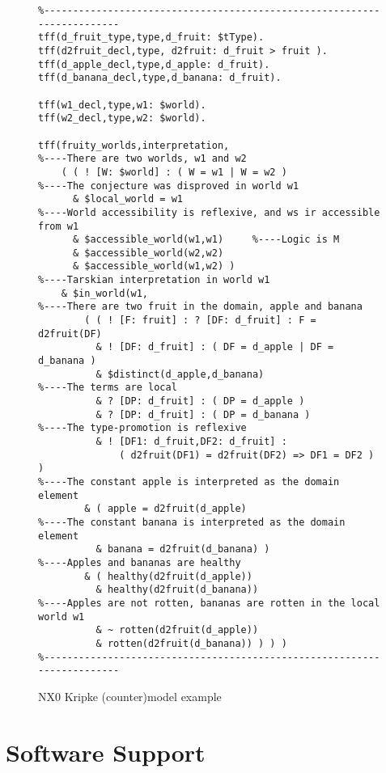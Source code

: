 \documentclass{ceurart}
\begin{document}
\begin{figure}[h!]
\small
{}
\begin{verbatim}
%------------------------------------------------------------------------
tff(d_fruit_type,type,d_fruit: $tType).
tff(d2fruit_decl,type, d2fruit: d_fruit > fruit ).
tff(d_apple_decl,type,d_apple: d_fruit).
tff(d_banana_decl,type,d_banana: d_fruit).

tff(w1_decl,type,w1: $world).
tff(w2_decl,type,w2: $world).

tff(fruity_worlds,interpretation,
%----There are two worlds, w1 and w2
    ( ( ! [W: $world] : ( W = w1 | W = w2 )
%----The conjecture was disproved in world w1
      & $local_world = w1
%----World accessibility is reflexive, and ws ir accessible from w1
      & $accessible_world(w1,w1)     %----Logic is M
      & $accessible_world(w2,w2)
      & $accessible_world(w1,w2) )
%----Tarskian interpretation in world w1
    & $in_world(w1,
%----There are two fruit in the domain, apple and banana
        ( ( ! [F: fruit] : ? [DF: d_fruit] : F = d2fruit(DF)
          & ! [DF: d_fruit] : ( DF = d_apple | DF = d_banana )
          & $distinct(d_apple,d_banana)
%----The terms are local
          & ? [DP: d_fruit] : ( DP = d_apple )
          & ? [DP: d_fruit] : ( DP = d_banana )
%----The type-promotion is reflexive
          & ! [DF1: d_fruit,DF2: d_fruit] :
              ( d2fruit(DF1) = d2fruit(DF2) => DF1 = DF2 ) )
%----The constant apple is interpreted as the domain element
        & ( apple = d2fruit(d_apple)
%----The constant banana is interpreted as the domain element
          & banana = d2fruit(d_banana) )
%----Apples and bananas are healthy
        & ( healthy(d2fruit(d_apple))
          & healthy(d2fruit(d_banana))
%----Apples are not rotten, bananas are rotten in the local world w1
          & ~ rotten(d2fruit(d_apple))
          & rotten(d2fruit(d_banana)) ) ) )
%------------------------------------------------------------------------
\end{verbatim}
\caption{NX0 Kripke (counter)model example}
\label{NX0Kripke}
\end{figure}

\section{Software Support}
\label{SystemsTools}
\end{document}
